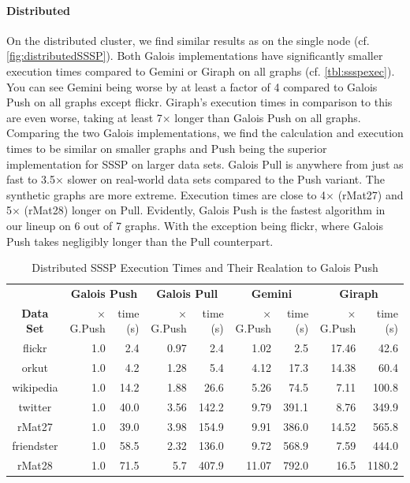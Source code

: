 \paragraph{Distributed}
On the distributed cluster, we find similar results as on the single node (cf. \autoref{fig:distributedSSSP}).
Both Galois implementations have significantly smaller execution times compared to Gemini or Giraph on all graphs (cf. \autoref{tbl:ssspexec}).
You can see Gemini being worse by at least a factor of 4 compared to Galois Push on all graphs except flickr.
Giraph's execution times in comparison to this are even worse, taking at least 7$\times$ longer than Galois Push on all graphs.
Comparing the two Galois implementations, we find the calculation and execution times to be similar on smaller graphs and Push being the superior implementation for SSSP on larger data sets. Galois Pull is anywhere from just as fast to 3.5$\times$ slower on real-world data sets compared to the Push variant. The synthetic graphs are more extreme. Execution times are close to 4$\times$ (rMat27) and 5$\times$ (rMat28) longer on Pull.
Evidently, Galois Push is the fastest algorithm in our lineup on 6 out of 7 graphs. With the exception being flickr, where Galois Push takes negligibly longer than the Pull counterpart.


\begin{table}
\renewcommand{\arraystretch}{1.2}
\renewcommand{\rot}[1]{\rotatebox{90}{#1}}
\centering
\caption{Distributed SSSP Execution Times and Their Realation to Galois Push}
\begin{tabular}{c@{\tabskip 1.4 \tabcolsep}r@{\tabskip 1 \tabcolsep}r@{\tabskip 1.4 \tabcolsep}r@{\tabskip 1 \tabcolsep}r@{\tabskip 1.4 \tabcolsep}r@{\tabskip 1 \tabcolsep}r@{\tabskip 1.4 \tabcolsep}r@{\tabskip 1 \tabcolsep}r}
\toprule
&
\multicolumn{2}{c}{\bf Galois Push}&\multicolumn{2}{c}{\bf Galois Pull}&\multicolumn{2}{c}{\bf Gemini}&\multicolumn{2}{c}{\bf Giraph}\\
\cmidrule{2-3}\cmidrule{4-5}\cmidrule{6-7}\cmidrule{8-9}
\bf{Data Set}&$\times$G.Push&time (s)&$\times$G.Push&time (s)&$\times$G.Push&time (s)&$\times$G.Push&time (s)\\\midrule
flickr & 1.0 & 2.4 & 0.97 & 2.4 & 1.02 & 2.5 & 17.46 & 42.6\\
orkut & 1.0 & 4.2 & 1.28 & 5.4 & 4.12 & 17.3 & 14.38 & 60.4\\
wikipedia & 1.0 & 14.2 & 1.88 & 26.6 & 5.26 & 74.5 & 7.11 & 100.8 \\
twitter & 1.0 & 40.0 & 3.56 & 142.2 & 9.79 & 391.1 & 8.76 & 349.9\\
rMat27 & 1.0 & 39.0 & 3.98 & 154.9 & 9.91 & 386.0 & 14.52 & 565.8\\
friendster & 1.0 & 58.5 & 2.32 & 136.0 & 9.72 & 568.9 & 7.59 & 444.0\\
rMat28 & 1.0 & 71.5 & 5.7 & 407.9 & 11.07 & 792.0 & 16.5 & 1180.2\\\bottomrule
\end{tabular}
\label{tbl:ssspexec}
\end{table}

